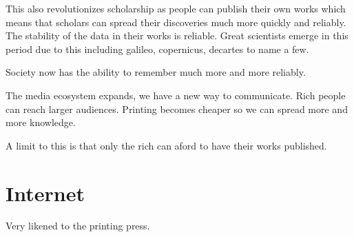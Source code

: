 \documentclass{article}
\begin{document}
This also revolutionizes scholarship as people can publish their own works which means that scholars can spread their discoveries much more quickly and reliably. The stability of the data in their works is reliable. Great scientists emerge in this period due to this including galileo, copernicus, decartes to name a few.

Society now has the ability to remember much more and more reliably.

The media ecosystem expands, we have a new way to communicate. Rich people can reach larger audiences. Printing becomes cheaper so we can spread more and more knowledge.

A limit to this is that only the rich can aford to have their works published.

\section*{Internet}
\label{sec:internet}
Very likened to the printing press.
\end{document}
